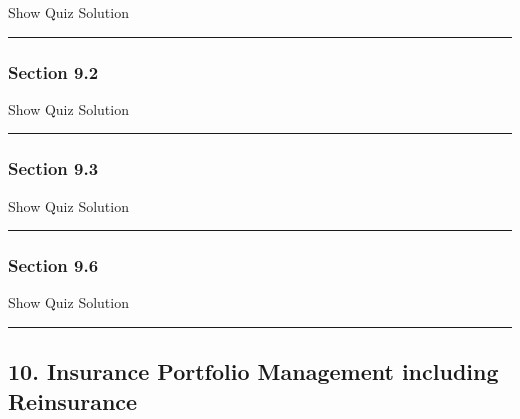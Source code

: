 \documentclass[]{article}
\begin{document}
\hypertarget{surveyElement91}{}

\hypertarget{surveyResult91}{}

Show Quiz Solution

\hypertarget{display.Quiz91.2}{}
\begin{center}\rule{0.5\linewidth}{\linethickness}\end{center}

\subsubsection{Section 9.2}\label{section-9.2}

\hypertarget{surveyElement92}{}

\hypertarget{surveyResult92}{}

Show Quiz Solution

\hypertarget{display.Quiz92.2}{}
\begin{center}\rule{0.5\linewidth}{\linethickness}\end{center}

\subsubsection{Section 9.3}\label{section-9.3}

\hypertarget{surveyElement93}{}

\hypertarget{surveyResult93}{}

Show Quiz Solution

\hypertarget{display.Quiz93.2}{}
\begin{center}\rule{0.5\linewidth}{\linethickness}\end{center}

\subsubsection{Section 9.6}\label{section-9.6}

\hypertarget{surveyElement96}{}

\hypertarget{surveyResult96}{}

Show Quiz Solution

\hypertarget{display.Quiz96.2}{}
\begin{center}\rule{0.5\linewidth}{\linethickness}\end{center}

\subsection{10. Insurance Portfolio Management including
Reinsurance}\label{insurance-portfolio-management-including-reinsurance}
\end{document}
